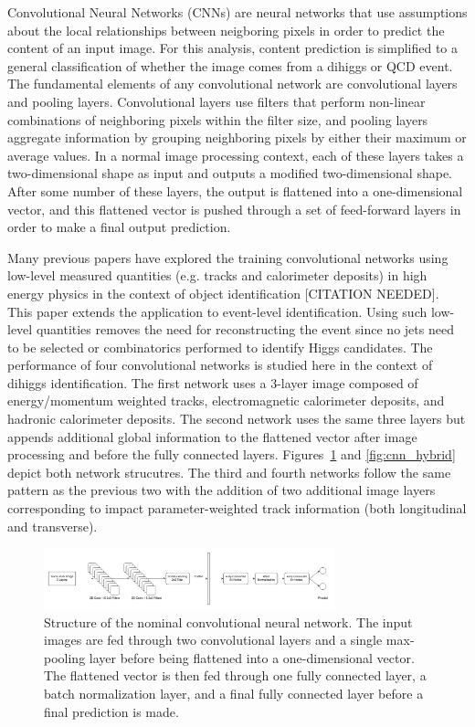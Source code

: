 \label{sec:CNN}
Convolutional Neural Networks (CNNs) are neural networks that use assumptions about the local relationships between neigboring pixels in order to predict the content of an input image. For this analysis, content prediction is simplified to a general classification of whether the image comes from a dihiggs or QCD event. The fundamental elements of any convolutional network are convolutional layers and pooling layers. Convolutional layers use filters that perform non-linear combinations of neighboring pixels within the filter size, and pooling layers aggregate information by grouping neighboring pixels by either their maximum or average values. In a normal image processing context, each of these layers takes a two-dimensional shape as input and outputs a modified two-dimensional shape. After some number of these layers, the output is flattened into a one-dimensional vector, and this flattened vector is pushed through a set of feed-forward layers in order to make a final output prediction. 

Many previous papers have explored the training convolutional networks using low-level measured quantities (e.g. tracks and calorimeter deposits) in high energy physics in the context of object identification [CITATION NEEDED]. This paper extends the application to event-level identification. Using such low-level quantities removes the need for reconstructing the event since no jets need to be selected or combinatorics performed to identify Higgs candidates. The performance of four convolutional networks is studied here in the context of dihiggs identification. The first network uses a 3-layer image composed of energy/momentum weighted tracks, electromagnetic calorimeter deposits, and hadronic calorimeter deposits. The second network uses the same three layers but appends additional global information to the flattened vector after image processing and before the fully connected layers. Figures~\ref{fig:cnn_nominal} and \ref{fig:cnn_hybrid} depict both network strucutres. The third and fourth networks follow the same pattern as the previous two with the addition of two additional image layers corresponding to impact parameter-weighted track information (both longitudinal and transverse).

\begin{figure}[!h] 
\begin{center}
\includegraphics*[width=0.75\textwidth] {CNN/figures/nominalCNN.png}
\caption{Structure of the nominal convolutional neural network. The input images are fed through two convolutional layers and a single max-pooling layer before being flattened into a one-dimensional vector. The flattened vector is then fed through one fully connected layer, a batch normalization layer, and a final fully connected layer before a final prediction is made.}
  \label{fig:cnn_nominal}
\end{center}
\end{figure}

